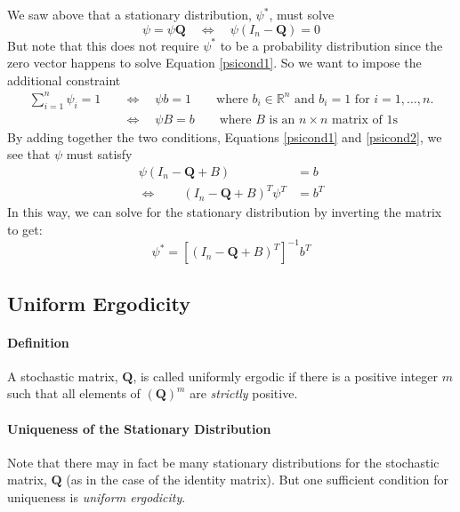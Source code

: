 \documentclass[12pt]{article}
\theoremstyle{plain}
\theoremstyle{definition}
\theoremstyle{remark}
\begin{document}
We saw above that a stationary distribution, $\psi^*$, must solve 
\begin{equation}
    \label{psicond1}
    \psi = \psi \mathbf{Q} \quad \Leftrightarrow \quad
    \psi \left(I_n - \mathbf{Q}\right) = 0
\end{equation}
But note that this does not require $\psi^*$ to be a probability
distribution since the zero vector happens to solve Equation
\ref{psicond1}. So we want to impose the additional constraint
\begin{align}
    \sum_{i=1}^n \psi_i = 1 \quad &\Leftrightarrow \quad
    \psi b = 1 \qquad \text{where $b_i \in \mathbb{R}^n$ and
				$b_i=1$ for $i=1,\ldots,n$.} \nonumber \\ 
    &\Leftrightarrow \quad \psi B = b 
    \qquad \text{where $B$ is an $n\times n$ matrix of 1s}
    \label{psicond2}
\end{align}
By adding together the two conditions, Equations \ref{psicond1}
and \ref{psicond2}, we see that $\psi$ must satisfy 
\begin{align*}
    \psi \left(I_n - \mathbf{Q} + B\right) &= b \\
    \Leftrightarrow \qquad
	\left(I_n - \mathbf{Q} + B\right)^T \psi^T &= b^T 
\end{align*}
In this way, we can solve for the stationary distribution
by inverting the matrix to get:
\begin{equation}
    \psi^* = \left[\left(I_n - \mathbf{Q} + B\right)^T\right]^{-1}
	b^T
\end{equation}


\subsection{Uniform Ergodicity} 

\paragraph{Definition}
A stochastic matrix, $\mathbf{Q}$,
is called uniformly ergodic if there is a positive
integer $m$ such that all elements of $\left(\mathbf{Q}\right)^m$
are \emph{strictly} positive.

\paragraph{Uniqueness of the Stationary Distribution}
Note that there may in fact be
many stationary distributions for the stochastic matrix,
$\mathbf{Q}$ (as in the case of the identity matrix).
But one sufficient condition for uniqueness is 
\emph{uniform ergodicity}.  
\end{document}
